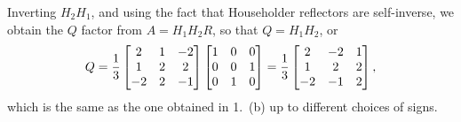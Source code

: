 \documentclass{homework}
\begin{document}
\begin{alphaparts}
\begin{equation*}
		\end{equation*}
		Inverting $H_2H_1$, and using the fact that Householder reflectors are self-inverse, we obtain the $Q$ factor from $A = H_1H_2R$, so that $Q = H_1H_2$, or
		\begin{equation*}
			Q = \frac{1}{3}\left[\begin{matrix}2 & 1 & -2 \\ 1 & 2 & 2 \\ -2 & 2 & -1\end{matrix}\right]\left[\begin{matrix}1 & 0 & 0 \\ 0 & 0 & 1 \\ 0 & 1 & 0\end{matrix}\right] = \frac{1}{3}\left[\begin{matrix}2 & -2 & 1 \\ 1 & 2 & 2 \\ -2 & -1 & 2\end{matrix}\right],
		\end{equation*}
		which is the same as the one obtained in 1.\ (b) up to different choices of signs.
	\end{alphaparts}
\end{document}

